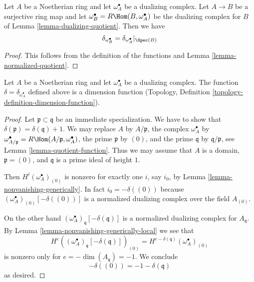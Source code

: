 \begin{lemma}
\label{lemma-quotient-function}
Let $A$ be a Noetherian ring and let $\omega_A^\bullet$ be a dualizing
complex. Let $A \to B$ be a surjective ring map and let
$\omega_B^\bullet = R\Hom(B, \omega_A^\bullet)$ be the dualizing
complex for $B$ of Lemma \ref{lemma-dualizing-quotient}. Then we have
$$
\delta_{\omega_B^\bullet} = \delta_{\omega_A^\bullet}|_{\Spec(B)}
$$
\end{lemma}

\begin{proof}
This follows from the definition of the functions and
Lemma \ref{lemma-normalized-quotient}.
\end{proof}

\begin{lemma}
\label{lemma-dimension-function}
Let $A$ be a Noetherian ring and let $\omega_A^\bullet$ be a dualizing
complex. The function $\delta = \delta_{\omega_A^\bullet}$
defined above is a dimension function
(Topology, Definition \ref{topology-definition-dimension-function}).
\end{lemma}

\begin{proof}
Let $\mathfrak p \subset \mathfrak q$ be an immediate specialization.
We have to show that $\delta(\mathfrak p) = \delta(\mathfrak q) + 1$.
We may replace $A$ by $A/\mathfrak p$, the complex $\omega_A^\bullet$ by
$\omega_{A/\mathfrak p}^\bullet = R\Hom(A/\mathfrak p, \omega_A^\bullet)$,
the prime $\mathfrak p$ by $(0)$, and the prime $\mathfrak q$
by $\mathfrak q/\mathfrak p$,
see Lemma \ref{lemma-quotient-function}. Thus we may assume that
$A$ is a domain, $\mathfrak p = (0)$, and $\mathfrak q$ is a prime
ideal of height $1$.

\medskip\noindent
Then $H^i(\omega_A^\bullet)_{(0)}$ is nonzero
for exactly one $i$, say $i_0$, by Lemma \ref{lemma-nonvanishing-generically}.
In fact $i_0 = -\delta((0))$ because
$(\omega_A^\bullet)_{(0)}[-\delta((0))]$
is a normalized dualizing complex over the field $A_{(0)}$.

\medskip\noindent
On the other hand $(\omega_A^\bullet)_\mathfrak q[-\delta(\mathfrak q)]$
is a normalized dualizing complex for $A_\mathfrak q$. By
Lemma \ref{lemma-nonvanishing-generically-local}
we see that
$$
H^e((\omega_A^\bullet)_\mathfrak q[-\delta(\mathfrak q)])_{(0)} =
H^{e - \delta(\mathfrak q)}(\omega_A^\bullet)_{(0)}
$$
is nonzero only for $e = -\dim(A_\mathfrak q) = -1$.
We conclude
$$
-\delta((0)) = -1 - \delta(\mathfrak q)
$$
as desired.
\end{proof}

